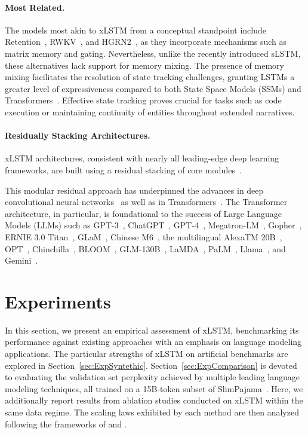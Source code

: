 \paragraph{Most Related.} The models most akin to xLSTM from a conceptual standpoint include Retention~\citep{Sun:23arxiv}, RWKV~\citep{Peng:23arxivshort,Peng:24arxivshort}, and HGRN2~\citep{Qin:24arxiv}, as they incorporate mechanisms such as matrix memory and gating. Nevertheless, unlike the recently introduced sLSTM, these alternatives lack support for memory mixing. The presence of memory mixing facilitates the resolution of state tracking challenges, granting LSTMs a greater level of expressiveness compared to both State Space Models (SSMs) and Transformers~\citep{Merrill:24,Deletang:23}. Effective state tracking proves crucial for tasks such as code execution or maintaining continuity of entities throughout extended narratives.

\paragraph{Residually Stacking Architectures.} xLSTM architectures, consistent with nearly all leading-edge deep learning frameworks, are built using a residual stacking of core modules~\citep{Srivastava:15,He:16}.

This modular residual approach has underpinned the advances in deep convolutional neural networks~\citep{He:16} as well as in Transformers~\citep{Vaswani:17}. The Transformer architecture, in particular, is foundational to the success of Large Language Models (LLMs) such as GPT-3~\citep{Brown:20short}, ChatGPT~\citep{Schulman:22short}, GPT-4~\citep{Achiam:23gpt4short}, Megatron-LM~\citep{Shoeybi:19}, Gopher~\citep{Rae:21short}, ERNIE 3.0 Titan~\citep{Wang:21arxivshort}, GLaM~\citep{Du:21glamshort}, Chinese M6~\citep{Lin:21}, the multilingual AlexaTM 20B~\citep{Soltan:22}, OPT~\citep{Zhang:22opt}, Chinchilla~\citep{Hoffmann:22short}, BLOOM~\citep{Scao:22arxivshort}, GLM-130B~\citep{Zeng:22arxivshort}, LaMDA~\citep{Thoppilan:22short}, PaLM~\citep{Chowdhery:22short}, Llama~\citep{Touvron:23arxiv}, and Gemini~\citep{GeminiTeam:23arxiv,Reid:24arxiv}.

\section{Experiments}
\label{sec:Exp}

In this section, we present an empirical assessment of xLSTM, benchmarking its performance against existing approaches with an emphasis on language modeling applications. The particular strengths of xLSTM on artificial benchmarks are explored in Section~\ref{sec:ExpSyntethic}. 
Section~\ref{sec:ExpComparison} is devoted to evaluating the validation set perplexity achieved by multiple leading language modeling techniques, all trained on a 15B-token subset of SlimPajama~\citep{Soboleva:23}. Here, we additionally report results from ablation studies conducted on xLSTM within the same data regime. The scaling laws exhibited by each method are then analyzed following the frameworks of \citet{Kaplan:20} and \citet{Brown:20short}.

